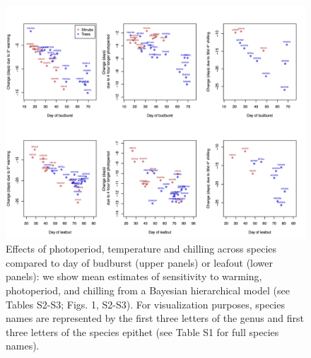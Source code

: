 \documentclass[11pt]{article}
\begin{document}
\newpage
\begin{figure}
\includegraphics[width=1\textwidth]{Sens_vs_day_treeshrub.png}
\caption{Effects of photoperiod, temperature and chilling across species compared to day of budburst (upper panels) or leafout (lower panels): we show mean estimates of sensitivity to warming, photoperiod, and chilling from a Bayesian hierarchical model (see Tables S2-S3; Figs. 1, S2-S3). For visualization purposes, species names are represented by the first three letters of the genus and first three letters of the species epithet (see Table S1 for full species names).}
\label{fig:commsens}
\end{figure}



\end{document}
